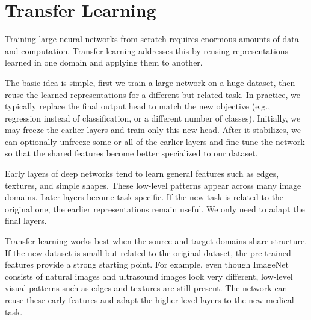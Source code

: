 \section{Transfer Learning}

\medskip

Training large neural networks from scratch requires enormous amounts of data and computation. Transfer learning addresses this by reusing representations learned in one domain and applying them to another.

The basic idea is simple, first we train a large network on a huge dataset, then reuse the learned representations for a different but related task. In practice, we typically replace the final output head to match the new objective (e.g., regression instead of classification, or a different number of classes). Initially, we may freeze the earlier layers and train only this new head. After it stabilizes, we can optionally unfreeze some or all of the earlier layers and fine-tune the network so that the shared features become better specialized to our dataset.

\medskip

Early layers of deep networks tend to learn general features such as edges, textures, and simple shapes.  
These low-level patterns appear across many image domains. Later layers become task-specific. If the new task is related to the original one, the earlier representations remain useful. We only need to adapt the final layers.

\medskip

Transfer learning works best when the source and target domains share structure.  If the new dataset is small but related to the original dataset, the pre-trained features provide a strong starting point. For example, even though ImageNet consists of natural images and ultrasound images look very different, low-level visual patterns such as edges and textures are still present. The network can reuse these early features and adapt the higher-level layers to the new medical task.

\bigskip

